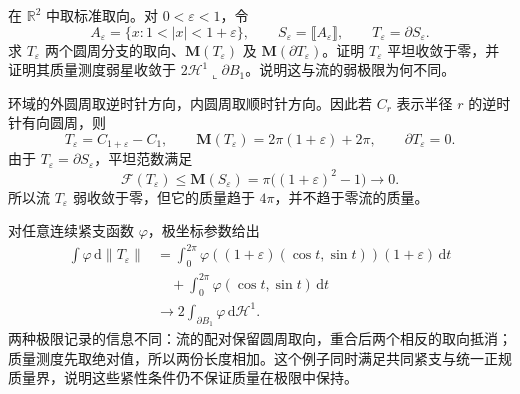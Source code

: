 \begin{exercise}\label{g3:ex:annular-current-cancellation}
	在 \(\mathbb R^2\) 中取标准取向。对 \(0<\varepsilon<1\)，令
	\[
		A_\varepsilon=\{x:1<|x|<1+\varepsilon\},\qquad
		S_\varepsilon=\lBrack A_\varepsilon\rBrack,\qquad
		T_\varepsilon=\partial S_\varepsilon.
	\]
	求 \(T_\varepsilon\) 两个圆周分支的取向、\(\mathbf M(T_\varepsilon)\) 及 \(\mathbf M(\partial T_\varepsilon)\)。证明 \(T_\varepsilon\) 平坦收敛于零，并证明其质量测度弱星收敛于 \(2\mathcal H^1\llcorner\partial B_1\)。说明这与流的弱极限为何不同。
\end{exercise}
\begin{solution}
	环域的外圆周取逆时针方向，内圆周取顺时针方向。因此若 \(C_r\) 表示半径 \(r\) 的逆时针有向圆周，则
	\[
		T_\varepsilon=C_{1+\varepsilon}-C_1,
		\qquad \mathbf M(T_\varepsilon)=2\pi(1+\varepsilon)+2\pi,
		\qquad \partial T_\varepsilon=0.
	\]
	由于 \(T_\varepsilon=\partial S_\varepsilon\)，平坦范数满足
	\[
		\mathcal F(T_\varepsilon)\le\mathbf M(S_\varepsilon)
		=\pi\bigl((1+\varepsilon)^2-1\bigr)\longrightarrow0.
	\]
	所以流 \(T_\varepsilon\) 弱收敛于零，但它的质量趋于 \(4\pi\)，并不趋于零流的质量。

	对任意连续紧支函数 \(\varphi\)，极坐标参数给出
	\[
	\begin{aligned}
		\int\varphi\,\mathrm d\|T_\varepsilon\|
		&=\int_0^{2\pi}\varphi((1+\varepsilon)(\cos t,\sin t))(1+\varepsilon)\,\mathrm dt\\
		&\quad+\int_0^{2\pi}\varphi(\cos t,\sin t)\,\mathrm dt\\
		&\longrightarrow2\int_{\partial B_1}\varphi\,\mathrm d\mathcal H^1.
	\end{aligned}
	\]
	两种极限记录的信息不同：流的配对保留圆周取向，重合后两个相反的取向抵消；质量测度先取绝对值，所以两份长度相加。这个例子同时满足共同紧支与统一正规质量界，说明这些紧性条件仍不保证质量在极限中保持。
\end{solution}

